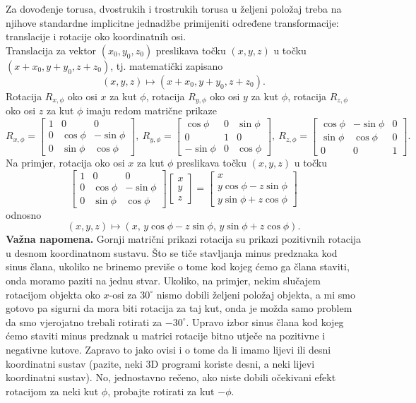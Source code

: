 \documentclass[a4paper,12pt]{article}
\theoremstyle{zad}
\begin{document}
\noindent Za dovođenje torusa, dvostrukih i trostrukih torusa u željeni položaj treba na njihove standardne implicitne jednadžbe
primijeniti određene transformacije: translacije i rotacije oko koordinatnih osi.\\[3pt]
Translacija za vektor $(x_0,y_0,z_0)$ preslikava to\v{c}ku $(x,y,z)$ u to\v{c}ku
$(x+x_0,y+y_0,z+z_0)$, tj. matemati\v{c}ki zapisano
$$(x,y,z)\mapsto(x+x_0,y+y_0,z+z_0).$$
Rotacija $R_{x,\phi}$ oko osi $x$ za kut $\phi$, rotacija $R_{y,\phi}$ oko osi $y$ za kut $\phi$, rotacija $R_{z,\phi}$ oko osi $z$ za kut $\phi$ imaju redom
matri\v{c}ne prikaze
$$
R_{x,\phi}=\begin{bmatrix}1&0&0\\ 0&\cos{\phi}&-\sin{\phi}\\ 0&\sin{\phi}&\cos{\phi}\end{bmatrix},\
R_{y,\phi}=\begin{bmatrix}\cos{\phi}&0&\sin{\phi}\\ 0&1&0\\ -\sin{\phi}&0&\cos{\phi}\end{bmatrix},\
R_{z,\phi}=\begin{bmatrix}\cos{\phi}&-\sin{\phi}&0\\ \sin{\phi}&\cos{\phi}&0\\ 0&0&1\end{bmatrix}.
$$
Na primjer, rotacija oko osi $x$ za kut $\phi$ preslikava to\v{c}ku $(x,y,z)$ u to\v{c}ku
$$
\begin{bmatrix}1&0&0\\ 0&\cos{\phi}&-\sin{\phi}\\ 0&\sin{\phi}&\cos{\phi}\end{bmatrix}\begin{bmatrix}x\\ y\\ z\end{bmatrix}=
\begin{bmatrix}x\\ y\cos{\phi}-z\sin{\phi}\\ y\sin{\phi}+z\cos{\phi}\end{bmatrix}
$$
odnosno
$$(x,y,z)\mapsto (x,\,y\cos{\phi}-z\sin{\phi},\,y\sin{\phi}+z\cos{\phi}).$$
\textbf{Va\v{z}na napomena.} Gornji matri\v{c}ni prikazi rotacija su prikazi pozitivnih rotacija u desnom koordinatnom sustavu.
\v{S}to se ti\v{c}e stavljanja minus predznaka kod sinus \v{c}lana, ukoliko ne brinemo previ\v{s}e o tome kod kojeg \'cemo ga \v{c}lana staviti, onda moramo paziti na jednu stvar. Ukoliko, na primjer, nekim slu\v{c}ajem rotacijom objekta oko $x$-osi za $30^{\circ}$ nismo dobili \v{z}eljeni polo\v{z}aj objekta, a mi smo gotovo pa sigurni da mora biti rotacija za taj kut, onda je mo\v{z}da samo problem da smo vjerojatno trebali rotirati za $-30^{\circ}$. Upravo izbor sinus \v{c}lana kod kojeg \'cemo staviti minus predznak u matrici rotacije bitno utje\v{c}e na pozitivne i negativne kutove. Zapravo to jako ovisi i o tome da li imamo lijevi ili desni koordinatni sustav (pazite, neki 3D programi koriste desni, a neki lijevi koordinatni sustav). No, jednostavno re\v{c}eno, ako niste dobili o\v{c}ekivani efekt rotacijom za neki kut $\phi$, probajte rotirati za kut $-\phi$.  
 
\end{document}
